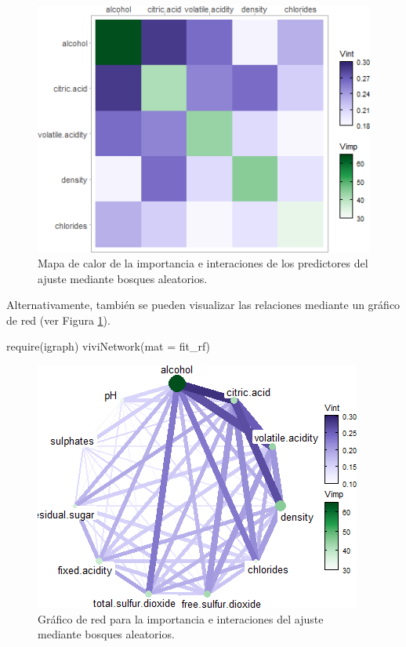 \documentclass[
]{book}
\newenvironment{Shaded}{\begin{snugshade}}{\end{snugshade}}
\newcommand{\AttributeTok}[1]{\textcolor[rgb]{0.77,0.63,0.00}{#1}}
\newcommand{\FunctionTok}[1]{\textcolor[rgb]{0.00,0.00,0.00}{#1}}
\newcommand{\NormalTok}[1]{#1}
\theoremstyle{break}
\theoremstyle{nonumberplain}
\begin{document}
\begin{figure}[!htb]

{\centering \includegraphics[width=0.75\linewidth]{images/rf-vivid-1} 

}

\caption{Mapa de calor de la importancia e interaciones de los predictores del ajuste mediante bosques aleatorios.}\label{fig:rf-vivid-plot}
\end{figure}

Alternativamente, también se pueden visualizar las relaciones mediante un gráfico de red (ver Figura \ref{fig:rf-vivid-plot}).

\begin{Shaded}
\begin{Highlighting}[]
\FunctionTok{require}\NormalTok{(igraph)}
\FunctionTok{viviNetwork}\NormalTok{(}\AttributeTok{mat =}\NormalTok{ fit\_rf)}
\end{Highlighting}
\end{Shaded}

\begin{figure}[!htb]

{\centering \includegraphics[width=0.8\linewidth]{images/rf-vivid2-1} 

}

\caption{Gráfico de red para la importancia e interaciones del ajuste mediante bosques aleatorios.}\label{fig:rf-vivid2-plot}
\end{figure}
\end{document}
